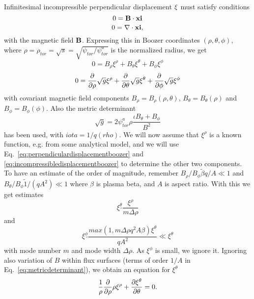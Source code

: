Infinitesimal incompressible perpendicular displacement ${\bf \xi}$ must
satisfy conditions
\begin{equation}
  0 = {\bf B} \cdot {\bf xi}
\end{equation}
\begin{equation}
  0 = \nabla \cdot {\bf xi},
\end{equation}
with the magnetic field ${\bf B}$. Expressing this in Boozer coordinates
$(\rho, \theta, \phi)$, where $\rho = \rho_{tor} = \sqrt{s} = \sqrt{\psi_{tor}/\psi_{tor}^a}$
is the normalized radius, we get
\begin{equation}
  0 = B_{\rho} \xi^{\rho} + B_{\theta} \xi^{\theta} + B_{\phi} \xi^{\phi}\label{eq:perpendiculardisplacementboozer}
\end{equation}
\begin{equation}
  0 = \frac{\partial }{\partial \rho} \sqrt{g} \xi^{\rho} + \frac{\partial }{\partial \theta} \sqrt{g} \xi^{\theta} + \frac{\partial }{\partial \phi} \sqrt{g} \xi^{\phi}
  \label{eq:imcompressibledisplacementboozer}
\end{equation}
with covariant magnetic field components $B_{\rho} = B_{\rho}(\rho, \theta)$,
$B_{\theta} = B_{\theta}(\rho)$ and $B_{\phi} = B_{\phi}(\phi)$. Also
the metric determinant
\begin{equation}
  \sqrt{g} = 2 \psi_{tor}^a \rho \frac{\iota B_{\theta} + B_{\phi}}{B^2}
  \label{eq:metricdeterminant}
\end{equation}
has been used, with $iota = 1/q(rho)$.
We will now assume that $\xi^{\rho}$ is a known function, e.g. from some
analytical model, and we will use Eq.~\eqref{eq:perpendiculardisplacementboozer}
and \eqref{eq:incompressibledisplacementboozer} to determine the other
two components.
To have an estimate of the order of magnitude, remember
$B_{\rho} / B_{\phi} \tilde \beta q / A \ll 1$ and
$B_{\theta} / B_{\phi} \tilde 1/(qA^2) \ll 1$ where $\beta$ is plasma
beta, and $A$ is aspect ratio. With this we get estimates
\begin{equation}
  \xi^{\theta} \tilde{} \frac{\xi^{\rho}}{m \Delta \rho}
\end{equation}
and
\begin{equation}
  \xi^{\phi} \tilde{} \frac{max(1, m \Delta \rho q^2 A \beta) \xi^{\theta}}{q A^2} \ll \xi^{\theta}
\end{equation}
with mode number $m$ and mode width $\Delta \rho$. As $\xi^{\phi}$ is
small, we ignore it. Ignoring also variation of $B$ within flux surfaces
(terms of order $1/A$ in Eq.~\eqref{eq:metricdeterminant}), we obtain
an equation for $\xi^{\theta}$
\begin{equation}
  \frac{1}{\rho} \frac{\partial }{\partial \rho}\rho \xi^{\rho} + \frac{\partial \xi^{\theta}}{\partial \theta} = 0.
  \label{eq:equationxitheta}
\end{equation}
